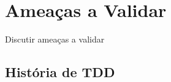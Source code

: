 \chapter{Ameaças a Validar}
\label{cap:ameacas}

Discutir ameaças a validar

\section{História de TDD}